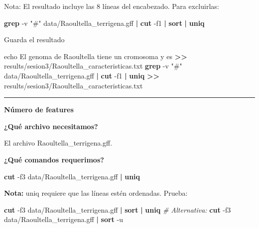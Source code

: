 \documentclass[
]{book}
\newenvironment{Shaded}{\begin{snugshade}}{\end{snugshade}}
\newcommand{\AttributeTok}[1]{\textcolor[rgb]{0.13,0.29,0.53}{#1}}
\newcommand{\BuiltInTok}[1]{#1}
\newcommand{\CommentTok}[1]{\textcolor[rgb]{0.56,0.35,0.01}{\textit{#1}}}
\newcommand{\FunctionTok}[1]{\textcolor[rgb]{0.13,0.29,0.53}{\textbf{#1}}}
\newcommand{\KeywordTok}[1]{\textcolor[rgb]{0.13,0.29,0.53}{\textbf{#1}}}
\newcommand{\NormalTok}[1]{#1}
\newcommand{\OperatorTok}[1]{\textcolor[rgb]{0.81,0.36,0.00}{\textbf{#1}}}
\newcommand{\StringTok}[1]{\textcolor[rgb]{0.31,0.60,0.02}{#1}}
\begin{document}
Nota: El resultado incluye las 8 líneas del encabezado. Para excluirlas:

\begin{Shaded}
\begin{Highlighting}[]
\FunctionTok{grep} \AttributeTok{{-}v} \StringTok{"\#"}\NormalTok{ data/Raoultella\_terrigena.gff }\KeywordTok{|} \FunctionTok{cut} \AttributeTok{{-}f1} \KeywordTok{|} \FunctionTok{sort} \KeywordTok{|} \FunctionTok{uniq}
\end{Highlighting}
\end{Shaded}

Guarda el resultado

\begin{Shaded}
\begin{Highlighting}[]
\BuiltInTok{echo} \StringTok{\textquotesingle{}El genoma de Raoultella tiene un cromosoma y es\textquotesingle{}} \OperatorTok{\textgreater{}\textgreater{}}\NormalTok{ results/sesion3/Raoultella\_caracteristicas.txt}
\FunctionTok{grep} \AttributeTok{{-}v} \StringTok{"\#"}\NormalTok{ data/Raoultella\_terrigena.gff }\KeywordTok{|} \FunctionTok{cut} \AttributeTok{{-}f1} \KeywordTok{|} \FunctionTok{uniq} \OperatorTok{\textgreater{}\textgreater{}}\NormalTok{ results/sesion3/Raoultella\_caracteristicas.txt}
\end{Highlighting}
\end{Shaded}

\begin{center}\rule{0.5\linewidth}{0.5pt}\end{center}

\textbf{Número de features}

\textbf{¿Qué archivo necesitamos?}

El archivo Raoultella\_terrigena.gff.

\textbf{¿Qué comandos requerimos?}

\begin{Shaded}
\begin{Highlighting}[]
\FunctionTok{cut} \AttributeTok{{-}f3}\NormalTok{ data/Raoultella\_terrigena.gff }\KeywordTok{|} \FunctionTok{uniq}
\end{Highlighting}
\end{Shaded}

\textbf{Nota:} uniq requiere que las líneas estén ordenadas. Prueba:

\begin{Shaded}
\begin{Highlighting}[]
\FunctionTok{cut} \AttributeTok{{-}f3}\NormalTok{ data/Raoultella\_terrigena.gff }\KeywordTok{|} \FunctionTok{sort} \KeywordTok{|} \FunctionTok{uniq}
\CommentTok{\# Alternativa:}
\FunctionTok{cut} \AttributeTok{{-}f3}\NormalTok{ data/Raoultella\_terrigena.gff }\KeywordTok{|} \FunctionTok{sort} \AttributeTok{{-}u}
\end{Highlighting}
\end{Shaded}
\end{document}
